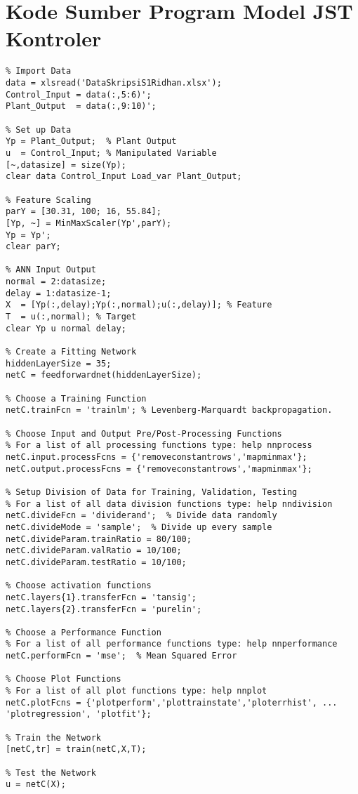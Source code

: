 \section{Kode Sumber Program Model JST Kontroler}
\begin{lstlisting}
% Import Data
data = xlsread('DataSkripsiS1Ridhan.xlsx');
Control_Input = data(:,5:6)';
Plant_Output  = data(:,9:10)';

% Set up Data
Yp = Plant_Output;  % Plant Output
u  = Control_Input; % Manipulated Variable
[~,datasize] = size(Yp);
clear data Control_Input Load_var Plant_Output;

% Feature Scaling
parY = [30.31, 100; 16, 55.84];
[Yp, ~] = MinMaxScaler(Yp',parY);
Yp = Yp';
clear parY;

% ANN Input Output
normal = 2:datasize;
delay = 1:datasize-1;
X  = [Yp(:,delay);Yp(:,normal);u(:,delay)]; % Feature
T  = u(:,normal); % Target
clear Yp u normal delay;

% Create a Fitting Network
hiddenLayerSize = 35;
netC = feedforwardnet(hiddenLayerSize);

% Choose a Training Function
netC.trainFcn = 'trainlm'; % Levenberg-Marquardt backpropagation.

% Choose Input and Output Pre/Post-Processing Functions
% For a list of all processing functions type: help nnprocess
netC.input.processFcns = {'removeconstantrows','mapminmax'};
netC.output.processFcns = {'removeconstantrows','mapminmax'};

% Setup Division of Data for Training, Validation, Testing
% For a list of all data division functions type: help nndivision
netC.divideFcn = 'dividerand';  % Divide data randomly
netC.divideMode = 'sample';  % Divide up every sample
netC.divideParam.trainRatio = 80/100;
netC.divideParam.valRatio = 10/100;
netC.divideParam.testRatio = 10/100;

% Choose activation functions
netC.layers{1}.transferFcn = 'tansig';
netC.layers{2}.transferFcn = 'purelin';

% Choose a Performance Function
% For a list of all performance functions type: help nnperformance
netC.performFcn = 'mse';  % Mean Squared Error

% Choose Plot Functions
% For a list of all plot functions type: help nnplot
netC.plotFcns = {'plotperform','plottrainstate','ploterrhist', ...
'plotregression', 'plotfit'};

% Train the Network
[netC,tr] = train(netC,X,T);

% Test the Network
u = netC(X);


\end{lstlisting}
